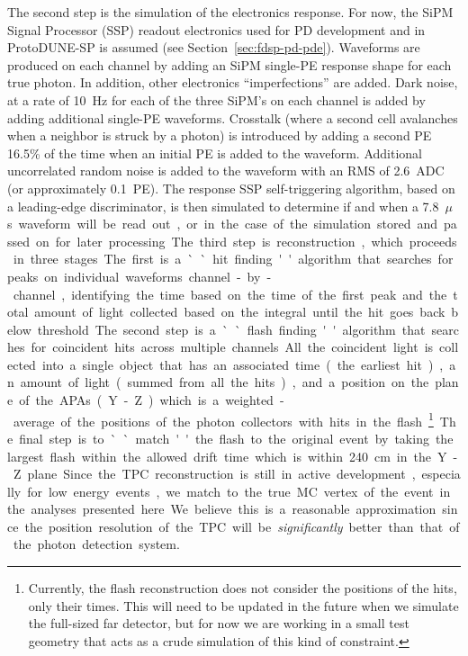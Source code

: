 The second step is the simulation of the electronics response. For now, the SiPM Signal Processor (SSP) readout electronics used for PD development and in ProtoDUNE-SP is assumed (see Section~\ref{sec:fdsp-pd-pde}). 
Waveforms are produced on each channel by adding an SiPM single-PE response shape for each true photon. In addition, other electronics ``imperfections'' are added. Dark noise, at a rate of \SI{10}{Hz} for each of the three SiPM's on each channel is added by adding additional single-PE waveforms. Crosstalk (where a second cell avalanches when a neighbor is struck by a photon) is introduced by adding a second PE \num{16.5}\% of the time when an initial PE is added to the waveform. Additional uncorrelated random noise is added to the waveform with an RMS of \SI{2.6}{ADC} (or approximately \SI{0.1}{PE}). The response  SSP self-triggering algorithm, based on a leading-edge discriminator, is then simulated to determine if and when a \SI{7.8}{$\mu$s} waveform will be read out, or in the case of the simulation stored and passed on for later processing.

The third step is reconstruction, which proceeds in three stages. The first is a ``hit finding'' algorithm that searches for peaks on individual waveforms channel-by-channel, identifying the time based on the time of the first peak and the total amount of light collected based on the integral until the hit goes back below threshold. The second step is a ``flash finding'' algorithm that searches for coincident hits across multiple channels. All the coincident light is collected into a single object that has an associated time (the earliest hit), an amount of light (summed from all the hits), and a position on the plane of the APAs (Y-Z) which is a weighted-average of the positions of the photon collectors with hits in the flash\footnote{Currently, the flash reconstruction does not consider the positions of the hits, only their times. This will need to be updated in the future when we simulate the full-sized far detector, but for now we are working in a small test geometry that acts as a crude simulation of this kind of constraint.}. The final step is to ``match'' the flash to the original event by taking the largest flash within the allowed drift time which is within \SI{240}{cm} in the Y-Z plane. Since the TPC reconstruction is still in active development, especially for low energy events, we match to the true MC vertex of the event in the analyses presented here. We believe this is a reasonable approximation since the position resolution of the TPC will be \emph{significantly} better than that of the photon detection system. 


